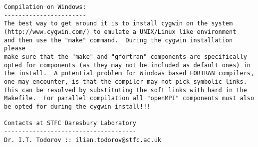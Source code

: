 \begin{verbatim}
Compilation on Windows:
-----------------------
The best way to get around it is to install cygwin on the system
(http://www.cygwin.com/) to emulate a UNIX/Linux like environment
and then use the "make" command.  During the cygwin installation please
make sure that the "make" and "gfortran" components are specifically
opted for components (as they may not be included as default ones) in
the install.  A potential problem for Windows based FORTRAN compilers,
one may encounter, is that the compiler may not pick symbolic links.
This can be resolved by substituting the soft links with hard in the
Makefile.  For parallel compilation all "openMPI" components must also
be opted for during the cygwin install!!!

Contacts at STFC Daresbury Laboratory
-------------------------------------
Dr. I.T. Todorov :: ilian.todorov@stfc.ac.uk
\end{verbatim}

